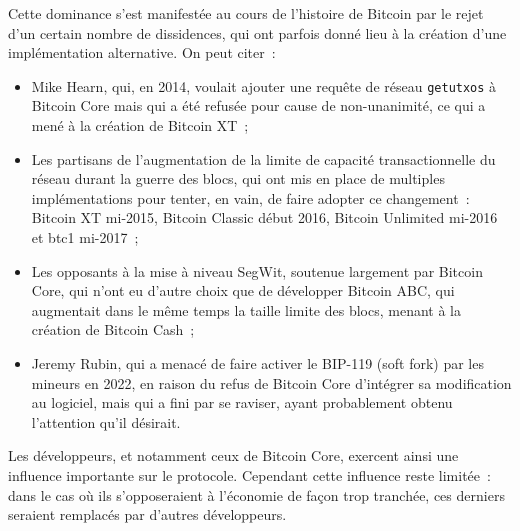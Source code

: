 Cette dominance s'est manifestée au cours de l'histoire de Bitcoin par le rejet d'un certain nombre de dissidences, qui ont parfois donné lieu à la création d'une implémentation alternative. On peut citer~:

\begin{itemize}
\item Mike Hearn, qui, en 2014, voulait ajouter une requête de réseau \texttt{getutxos} à Bitcoin Core mais qui a été refusée pour cause de non-unanimité, ce qui a mené à la création de Bitcoin XT~;
\item Les partisans de l'augmentation de la limite de capacité transactionnelle du réseau durant la guerre des blocs, qui ont mis en place de multiples implémentations pour tenter, en vain, de faire adopter ce changement~: Bitcoin XT mi-2015, Bitcoin Classic début 2016, Bitcoin Unlimited mi-2016 et btc1 mi-2017~;
\item Les opposants à la mise à niveau SegWit, soutenue largement par Bitcoin Core, qui n'ont eu d'autre choix que de développer Bitcoin ABC, qui augmentait dans le même temps la taille limite des blocs, menant à la création de Bitcoin Cash~;
\item Jeremy Rubin, qui a menacé de faire activer le BIP-119 (soft fork) par les mineurs en 2022, en raison du refus de Bitcoin Core d'intégrer sa modification au logiciel, mais qui a fini par se raviser, ayant probablement obtenu l'attention qu'il désirait.
\end{itemize}

Les développeurs, et notamment ceux de Bitcoin Core, exercent ainsi une influence importante sur le protocole. Cependant cette influence reste limitée~: dans le cas où ils s'opposeraient à l'économie de façon trop tranchée, ces derniers seraient remplacés par d'autres développeurs.


